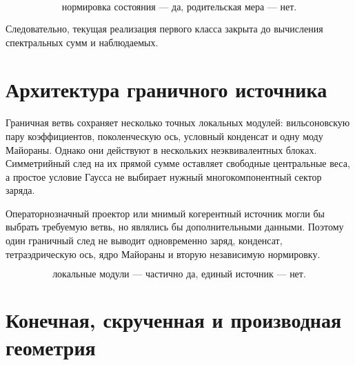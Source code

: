 \begin{equation}
 \boxed{\text{нормировка состояния --- да, родительская мера --- нет}.}
\end{equation}

Следовательно, текущая реализация первого класса закрыта до вычисления
спектральных сумм и наблюдаемых.

\section{Архитектура граничного источника}

Граничная ветвь сохраняет несколько точных локальных модулей:
вильсоновскую пару коэффициентов, поколенческую ось, условный конденсат и
одну моду Майораны. Однако они действуют в нескольких неэквивалентных
блоках. Симметрийный след на их прямой сумме оставляет свободные центральные
веса, а простое условие Гаусса не выбирает нужный многокомпонентный сектор
заряда.

Операторнозначный проектор или мнимый когерентный источник могли бы выбрать
требуемую ветвь, но являлись бы дополнительными данными. Поэтому один
граничный след не выводит одновременно заряд, конденсат, тетраэдрическую
ось, ядро Майораны и вторую независимую нормировку.

\begin{equation}
 \boxed{\text{локальные модули --- частично да, единый источник --- нет}.}
\end{equation}

\section{Конечная, скрученная и производная геометрия}

